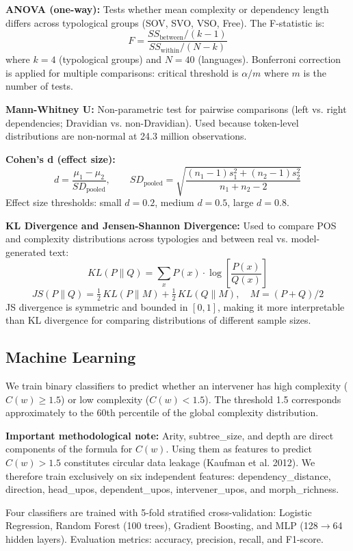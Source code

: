 \documentclass[11pt,a4paper]{article}
\begin{document}
\textbf{ANOVA (one-way):} Tests whether mean complexity or dependency length differs across typological groups (SOV, SVO, VSO, Free). The F-statistic is:
\[
F = \frac{SS_{\mathrm{between}} / (k-1)}{SS_{\mathrm{within}} / (N-k)}
\]
where $k = 4$ (typological groups) and $N = 40$ (languages). Bonferroni correction is applied for multiple comparisons: critical threshold is $\alpha / m$ where $m$ is the number of tests.

\textbf{Mann-Whitney U:} Non-parametric test for pairwise comparisons (left vs. right dependencies; Dravidian vs. non-Dravidian). Used because token-level distributions are non-normal at 24.3 million observations.

\textbf{Cohen's d (effect size):}
\[
d = \frac{\mu_1 - \mu_2}{SD_{\mathrm{pooled}}}, \qquad SD_{\mathrm{pooled}} = \sqrt{\frac{(n_1-1)s_1^2 + (n_2-1)s_2^2}{n_1+n_2-2}}
\]
Effect size thresholds: small $d = 0.2$, medium $d = 0.5$, large $d = 0.8$.

\textbf{KL Divergence and Jensen-Shannon Divergence:} Used to compare POS and complexity distributions across typologies and between real vs. model-generated text:
\[
KL(P \| Q) = \sum_x P(x) \cdot \log\!\left[\frac{P(x)}{Q(x)}\right]
\]
\[
JS(P \| Q) = \tfrac{1}{2}\,KL(P \| M) + \tfrac{1}{2}\,KL(Q \| M), \quad M = (P+Q)/2
\]
JS divergence is symmetric and bounded in $[0, 1]$, making it more interpretable than KL divergence for comparing distributions of different sample sizes.

\subsection{Machine Learning}
We train binary classifiers to predict whether an intervener has high complexity ($C(w) \geq 1.5$) or low complexity ($C(w) < 1.5$). The threshold 1.5 corresponds approximately to the 60th percentile of the global complexity distribution.

\textbf{Important methodological note:} Arity, subtree\_size, and depth are direct components of the formula for $C(w)$. Using them as features to predict $C(w) > 1.5$ constitutes circular data leakage (Kaufman et al. 2012). We therefore train exclusively on six independent features: dependency\_distance, direction, head\_upos, dependent\_upos, intervener\_upos, and morph\_richness.

Four classifiers are trained with 5-fold stratified cross-validation: Logistic Regression, Random Forest (100 trees), Gradient Boosting, and MLP (128$\rightarrow$64 hidden layers). Evaluation metrics: accuracy, precision, recall, and F1-score.
\end{document}
